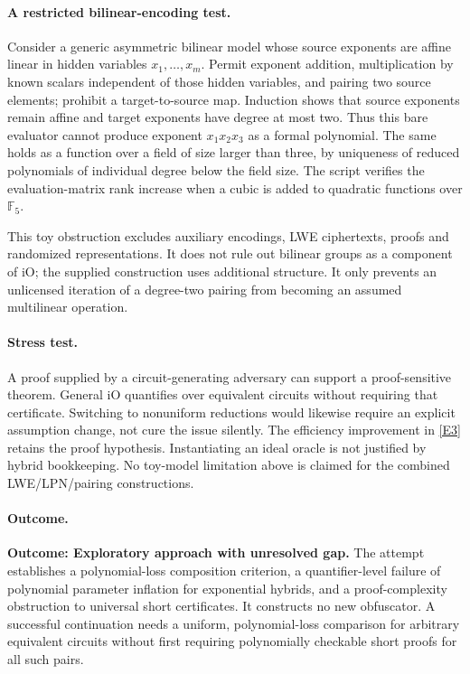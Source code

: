 \documentclass[11pt,a4paper]{article}
\newcommand{\F}{\mathbb{F}}
\newcommand{\eref}[2]{\hyperlink{extra:#1:#2}{[E#2]}}
\numberwithin{equation}{section}
\begin{document}
\paragraph{A restricted bilinear-encoding test.}
Consider a generic asymmetric bilinear model whose source exponents are
affine linear in hidden variables $x_1,\ldots,x_m$. Permit exponent addition,
multiplication by known scalars independent of those hidden variables, and
pairing two source elements; prohibit a target-to-source map. Induction
shows that source exponents remain affine and target exponents have degree
at most two. Thus this bare evaluator cannot produce exponent $x_1x_2x_3$
as a formal polynomial. The same holds as a function over a field of size
larger than three, by uniqueness of reduced polynomials of individual
degree below the field size. The script verifies the evaluation-matrix rank
increase when a cubic is added to quadratic functions over $\F_5$.

This toy obstruction excludes auxiliary encodings, LWE ciphertexts, proofs
and randomized representations. It does not rule out bilinear groups as a
component of iO; the supplied construction uses additional structure. It
only prevents an unlicensed iteration of a degree-two pairing from becoming
an assumed multilinear operation.

\paragraph{Stress test.}
A proof supplied by a circuit-generating adversary can support a
proof-sensitive theorem. General iO quantifies over equivalent circuits
without requiring that certificate. Switching to nonuniform reductions
would likewise require an explicit assumption change, not cure the issue
silently. The efficiency improvement in \eref{30006749}{3} retains the proof
hypothesis. Instantiating an ideal oracle is not justified by hybrid
bookkeeping. No toy-model limitation above is claimed for the combined
LWE/LPN/pairing constructions.

\paragraph{Outcome.}
\textbf{Outcome: Exploratory approach with unresolved gap.}
The attempt establishes a polynomial-loss composition criterion, a
quantifier-level failure of polynomial parameter inflation for exponential
hybrids, and a proof-complexity obstruction to universal short certificates.
It constructs no new obfuscator. A successful continuation needs a uniform,
polynomial-loss comparison for arbitrary equivalent circuits without first
requiring polynomially checkable short proofs for all such pairs.
\end{document}
